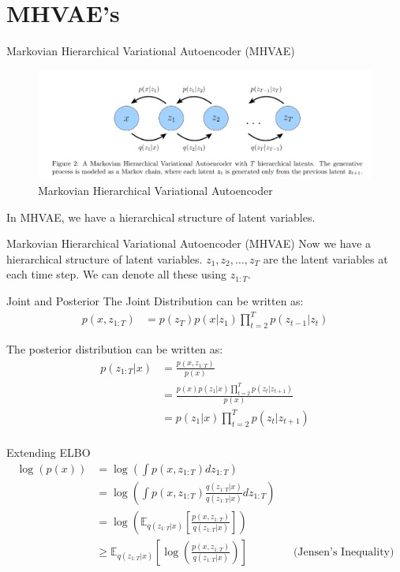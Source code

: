 \section*{MHVAE's}
\begin{frame}{Markovian Hierarchical Variational Autoencoder (MHVAE)}
    \begin{figure}
        \centering
        \includegraphics[width=1\textwidth]{Images/hvae1.png}
        \caption{Markovian Hierarchical Variational Autoencoder}
    \end{figure}

    In MHVAE, we have a hierarchical structure of latent variables. 
\end{frame}

\begin{frame}{Markovian Hierarchical Variational Autoencoder (MHVAE)}
    Now we have a hierarchical structure of latent variables.
    $z_1, z_2, \ldots, z_T$ are the latent variables at each time step. We can denote all these using $z_{1:T}$.
\end{frame}

\begin{frame}{Joint and Posterior}
    The Joint Distribution can be written as:  
    \begin{align*}
        p(x, z_{1:T}) &= p(z_T)p(x|z_1) \prod_{t=2}^{T} p(z_{t-1}|z_t)
    \end{align*}

    The posterior distribution can be written as:
    \begin{align*}
        p(z_{1:T}|x) &= \frac{p(x, z_{1:T})}{p(x)} \\
        &= \frac{p(x)p(z_1|x) \prod_{t=2}^{T} p(z_{t}|z_{t+1})}{p(x)} \\
        &= p(z_1|x) \prod_{t=2}^{T} p(z_{t}|z_{t+1}) \\
    \end{align*}
\end{frame}

\begin{frame}{Extending ELBO}
    \begin{align*}
        \log(p(x)) &= \log \left( \int p(x, z_{1:T}) dz_{1:T} \right) \\
        &= \log \left( \int p(x, z_{1:T}) \frac{q(z_{1:T}|x)}{q(z_{1:T}|x)} dz_{1:T} \right) \\
        &= \log \left( \mathbb{E}_{q(z_{1:T}|x)} \left[ \frac{p(x, z_{1:T})}{q(z_{1:T}|x)} \right] \right) \\
        &\geq \mathbb{E}_{q(z_{1:T}|x)} \left[ \log \left( \frac{p(x, z_{1:T})}{q(z_{1:T}|x)} \right) \right] && \text{(Jensen's Inequality)} \\
    \end{align*}
\end{frame}

